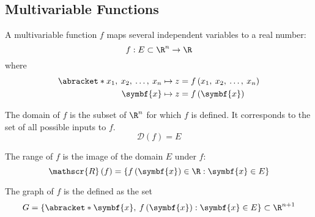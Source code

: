 \documentclass{article}
\begin{document}
\subsection{Multivariable Functions}
\begin{definition}
    A multivariable function \(f\) maps several independent variables to a real number:
    \begin{equation*}
        f : E \subset \R^n \to \R
    \end{equation*}
    where
    \begin{align*}
        \abracket*{x_1,\: x_2,\: \ldots,\: x_n} & \mapsto z = f\left( x_1,\: x_2,\: \ldots,\: x_n \right) \\
        \symbf{x}                               & \mapsto z = f\left( \symbf{x} \right)
    \end{align*}
\end{definition}
\begin{definition}[Domain]
    The domain of \(f\) is the subset of \(\R^n\) for which \(f\) is defined.
    It corresponds to the set of all possible inputs to \(f\).
    \begin{equation*}
        \mathscr{D} \left( f \right) = E
    \end{equation*}
\end{definition}
\begin{definition}[Range]
    The range of \(f\) is the image of the domain \(E\) under \(f\):
    \begin{equation*}
        \mathscr{R} \left( f \right) = \left\{ f\left( \symbf{x} \right) \in \R : \symbf{x} \in E \right\}
    \end{equation*}
\end{definition}
\begin{definition}[Graph]
    The graph of \(f\) is the defined as the set
    \begin{equation*}
        G = \left\{ \abracket*{\symbf{x},\: f\left( \symbf{x} \right)} : \symbf{x} \in E \right\} \subset \R^{n + 1}
    \end{equation*}
\end{definition}
\end{document}
